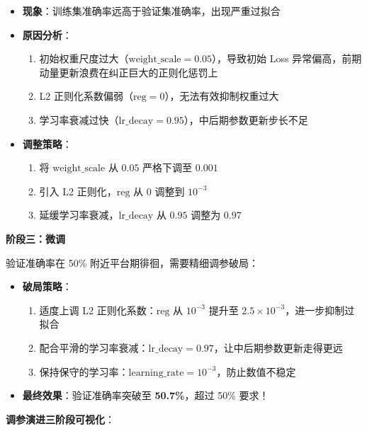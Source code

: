 \documentclass[a4paper]{article}
\begin{document}
\begin{itemize}
    \item \textbf{现象}：训练集准确率远高于验证集准确率，出现严重过拟合
    
    \item \textbf{原因分析}：
    \begin{enumerate}
        \item 初始权重尺度过大（$\text{weight\_scale} = 0.05$），导致初始 Loss 异常偏高，前期动量更新浪费在纠正巨大的正则化惩罚上
        \item L2 正则化系数偏弱（$\text{reg} = 0$），无法有效抑制权重过大
        \item 学习率衰减过快（$\text{lr\_decay} = 0.95$），中后期参数更新步长不足
    \end{enumerate}
    
    \item \textbf{调整策略}：
    \begin{enumerate}
        \item 将 $\text{weight\_scale}$ 从 $0.05$ 严格下调至 $0.001$
        \item 引入 L2 正则化，$\text{reg}$ 从 $0$ 调整到 $10^{-3}$
        \item 延缓学习率衰减，$\text{lr\_decay}$ 从 $0.95$ 调整为 $0.97$
    \end{enumerate}
    
\end{itemize}

\textbf{阶段三：微调}

验证准确率在 50\% 附近平台期徘徊，需要精细调参破局：

\begin{itemize}
    \item \textbf{破局策略}：
    \begin{enumerate}
        \item 适度上调 L2 正则化系数：$\text{reg}$ 从 $10^{-3}$ 提升至 $2.5 \times 10^{-3}$，进一步抑制过拟合
        \item 配合平滑的学习率衰减：$\text{lr\_decay} = 0.97$，让中后期参数更新走得更远
        \item 保持保守的学习率：$\text{learning\_rate} = 10^{-3}$，防止数值不稳定
    \end{enumerate}
    
    \item \textbf{最终效果}：验证准确率突破至 \textbf{50.7\%}，超过 50\% 要求！
\end{itemize}

\textbf{调参演进三阶段可视化}：
\end{document}
